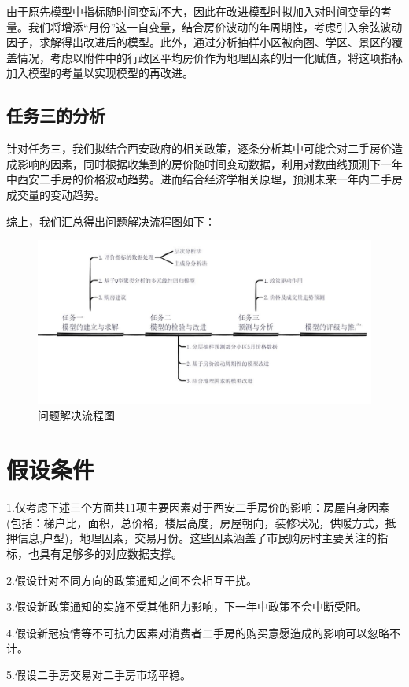 \documentclass[withoutpreface,bwprint]{cumcmthesis} %
\begin{document}
由于原先模型中指标随时间变动不大，因此在改进模型时拟加入对时间变量的考量。我们将增添“月份”这一自变量，结合房价波动的年周期性，考虑引入余弦波动因子，求解得出改进后的模型。此外，通过分析抽样小区被商圈、学区、景区的覆盖情况，考虑以附件中的行政区平均房价作为地理因素的归一化赋值，将这项指标加入模型的考量以实现模型的再改进。
\subsection{任务三的分析}
针对任务三，我们拟结合西安政府的相关政策，逐条分析其中可能会对二手房价造成影响的因素，同时根据收集到的房价随时间变动数据，利用对数曲线预测下一年中西安二手房的价格波动趋势。进而结合经济学相关原理，预测未来一年内二手房成交量的变动趋势。

综上，我们汇总得出问题解决流程图如下：
\begin{figure}[H]
	\centering
	\includegraphics[scale=0.45]{流程图.jpg}
	\caption{问题解决流程图}
	\label{fig:问题解决流程图}
\end{figure}

\section{假设条件}
1.仅考虑下述三个方面共11项主要因素对于西安二手房价的影响：房屋自身因素(包括：梯户比，面积，总价格，楼层高度，房屋朝向，装修状况，供暖方式，抵押信息,户型)，地理因素，交易月份。这些因素涵盖了市民购房时主要关注的指标，也具有足够多的对应数据支撑。

2.假设针对不同方向的政策通知之间不会相互干扰。

3.假设新政策通知的实施不受其他阻力影响，下一年中政策不会中断受阻。

4.假设新冠疫情等不可抗力因素对消费者二手房的购买意愿造成的影响可以忽略不计。

5.假设二手房交易对二手房市场平稳。
\end{document}

